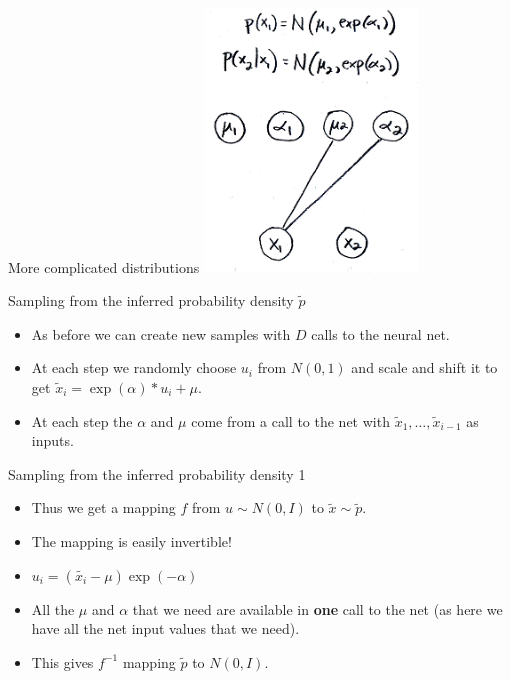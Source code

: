 \documentclass[usenames,dvipsnames]{beamer}
\begin{document}
\begin{frame}{More complicated distributions}
     \centering
     \includegraphics[height=7cm]{image_05}
\end{frame}


\begin{frame}{Sampling from the inferred probability density $\tilde{p}$}
    \begin{itemize}
      \item{As before we can create new samples with $D$ calls to the neural net.}
	\item{At each step we randomly choose $u_i$ from $N(0, 1)$ and scale and shift it to get $\tilde{x}_i = \exp(\alpha) * u_i + \mu$.}
	\item{At each step the $\alpha$ and $\mu$ come from a call to the net with $\tilde{x}_1, \dots, \tilde{x}_{i-1}$ as inputs.}
    \end{itemize}
\end{frame}

\begin{frame}{Sampling from the inferred probability density 1}
    \begin{itemize}
      \item{Thus we get a mapping $f$ from $u \sim N(0, I)$ to $\tilde{x} \sim \tilde{p}$.}
	\item{The mapping is easily invertible!}
	\item{$u_i = (\tilde{x_i} - \mu) \exp(-\alpha)$}
	\item{All the $\mu$ and $\alpha$ that we need are available in \textbf{one} call to the net (as here we have all the net input values that we need).}
	\item{This gives $f^{-1}$ mapping $\tilde{p}$ to $N(0, I)$.}
    \end{itemize}
\end{frame}
\end{document}
